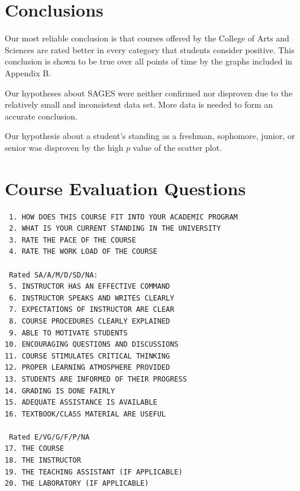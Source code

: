 \documentclass[12pt]{article}
\begin{document}
\section{Conclusions}
Our most reliable conclusion is that courses offered by the College of Arts and Sciences are rated better in every category that students consider positive. This conclusion is shown to be true over all points of time by the graphs included in Appendix B.

Our hypotheses about SAGES were neither confirmed nor disproven due to the relatively small and inconsistent data set. More data is needed to form an accurate conclusion.

Our hypothesis about a student's standing as a freshman, sophomore, junior, or senior was disproven by the high $p$ value of the scatter plot.

\appendix

\section{Course Evaluation Questions}
\begin{verbatim}
 1. HOW DOES THIS COURSE FIT INTO YOUR ACADEMIC PROGRAM
 2. WHAT IS YOUR CURRENT STANDING IN THE UNIVERSITY
 3. RATE THE PACE OF THE COURSE 
 4. RATE THE WORK LOAD OF THE COURSE
 
 Rated SA/A/M/D/SD/NA:
 5. INSTRUCTOR HAS AN EFFECTIVE COMMAND
 6. INSTRUCTOR SPEAKS AND WRITES CLEARLY
 7. EXPECTATIONS OF INSTRUCTOR ARE CLEAR
 8. COURSE PROCEDURES CLEARLY EXPLAINED
 9. ABLE TO MOTIVATE STUDENTS
10. ENCOURAGING QUESTIONS AND DISCUSSIONS
11. COURSE STIMULATES CRITICAL THINKING
12. PROPER LEARNING ATMOSPHERE PROVIDED
13. STUDENTS ARE INFORMED OF THEIR PROGRESS
14. GRADING IS DONE FAIRLY
15. ADEQUATE ASSISTANCE IS AVAILABLE
16. TEXTBOOK/CLASS MATERIAL ARE USEFUL

 Rated E/VG/G/F/P/NA
17. THE COURSE
18. THE INSTRUCTOR
19. THE TEACHING ASSISTANT (IF APPLICABLE)
20. THE LABORATORY (IF APPLICABLE)
\end{verbatim}
\end{document}
